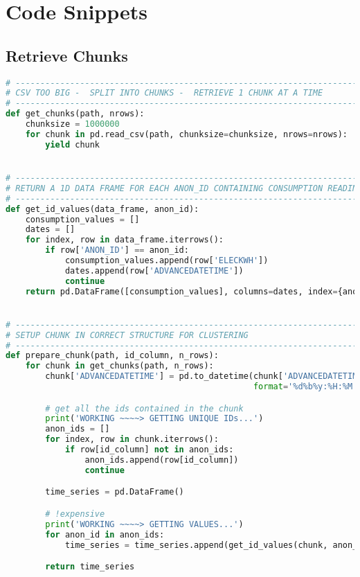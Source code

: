 \chapter{Code Snippets}
\section{Retrieve Chunks}
\begin{lstlisting}[language=Python]
# ------------------------------------------------------------------------
# CSV TOO BIG -  SPLIT INTO CHUNKS -  RETRIEVE 1 CHUNK AT A TIME
# ------------------------------------------------------------------------
def get_chunks(path, nrows):
    chunksize = 1000000
    for chunk in pd.read_csv(path, chunksize=chunksize, nrows=nrows):
        yield chunk


# ------------------------------------------------------------------------
# RETURN A 1D DATA FRAME FOR EACH ANON_ID CONTAINING CONSUMPTION READINGS
# ------------------------------------------------------------------------
def get_id_values(data_frame, anon_id):
    consumption_values = []
    dates = []
    for index, row in data_frame.iterrows():
        if row['ANON_ID'] == anon_id:
            consumption_values.append(row['ELECKWH'])
            dates.append(row['ADVANCEDATETIME'])
            continue
    return pd.DataFrame([consumption_values], columns=dates, index={anon_id})


# ------------------------------------------------------------------------
# SETUP CHUNK IN CORRECT STRUCTURE FOR CLUSTERING
# ------------------------------------------------------------------------
def prepare_chunk(path, id_column, n_rows):
    for chunk in get_chunks(path, n_rows):
        chunk['ADVANCEDATETIME'] = pd.to_datetime(chunk['ADVANCEDATETIME'],
                                                  format='%d%b%y:%H:%M:%S')

        # get all the ids contained in the chunk
        print('WORKING ~~~~> GETTING UNIQUE IDs...')
        anon_ids = []
        for index, row in chunk.iterrows():
            if row[id_column] not in anon_ids:
                anon_ids.append(row[id_column])
                continue

        time_series = pd.DataFrame()

        # !expensive
        print('WORKING ~~~~> GETTING VALUES...')
        for anon_id in anon_ids:
            time_series = time_series.append(get_id_values(chunk, anon_id))

        return time_series

\end{lstlisting}

